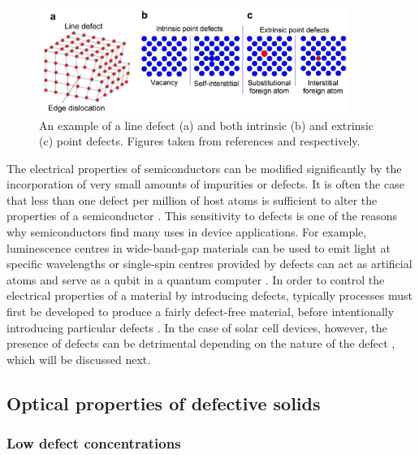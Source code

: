 \documentclass[11pt, twoside]{report}
\begin{document}
\begin{figure}[h!]
  \centering
    \includegraphics[width=0.9\textwidth]{figures/defects.png}
    \caption[An example of a line defect (a) and both intrinsic (b) and extrinsic (c) point defects.]{An example of a line defect (a) and both intrinsic (b) and extrinsic (c) point defects. Figures taken from references  and  respectively.}
  \label{defects}
\end{figure}

The electrical properties of semiconductors can be modified significantly by the incorporation of very small amounts of impurities or defects. It is often the case that less than one defect per million of host atoms is sufficient to alter the properties of a semiconductor \cite{fund_semi}. This sensitivity to defects is one of the reasons why semiconductors find many uses in device applications. For example, luminescence centres in wide-band-gap materials can be used to emit light at specific wavelengths or single-spin centres provided by defects can act as artificial atoms and serve as a qubit in a quantum computer \cite{defects_tutorial}. In order to control the electrical properties of a material by introducing defects, typically processes must first be developed to produce a fairly defect-free material, before intentionally introducing particular defects \cite{fund_semi}. In the case of solar cell devices, however, the presence of defects can be detrimental depending on the nature of the defect \cite{Aron_defect_tolerance}, which will be discussed next. 

\subsection{Optical properties of defective solids}
\subsubsection{Low defect concentrations}
\end{document}
